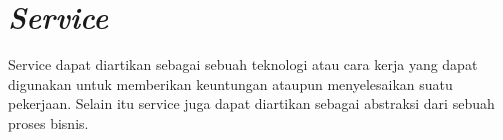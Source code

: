\section{\textit{Service}}

Service dapat diartikan sebagai sebuah teknologi atau cara kerja yang dapat digunakan untuk memberikan keuntungan ataupun menyelesaikan suatu pekerjaan. Selain itu service juga dapat diartikan sebagai abstraksi dari sebuah proses bisnis.